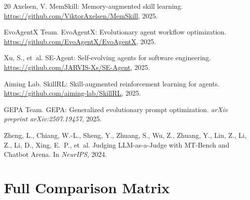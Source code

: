 \documentclass[11pt]{article}
\begin{document}
\begin{thebibliography}{20}
Axelsen, V.
\newblock MemSkill: Memory-augmented skill learning.
\newblock \url{https://github.com/ViktorAxelsen/MemSkill}, 2025.

EvoAgentX Team.
\newblock EvoAgentX: Evolutionary agent workflow optimization.
\newblock \url{https://github.com/EvoAgentX/EvoAgentX}, 2025.

Xu, S., et~al.
\newblock SE-Agent: Self-evolving agents for software engineering.
\newblock \url{https://github.com/JARVIS-Xs/SE-Agent}, 2025.

Aiming Lab.
\newblock SkillRL: Skill-augmented reinforcement learning for agents.
\newblock \url{https://github.com/aiming-lab/SkillRL}, 2025.

GEPA Team.
\newblock GEPA: Generalized evolutionary prompt optimization.
\newblock \emph{arXiv preprint arXiv:2507.19457}, 2025.

Zheng, L., Chiang, W.-L., Sheng, Y., Zhuang, S., Wu, Z., Zhuang, Y., Lin, Z., Li, Z., Li, D., Xing, E.~P., et~al.
\newblock Judging {LLM}-as-a-Judge with {MT}-Bench and Chatbot Arena.
\newblock In \emph{NeurIPS}, 2024.

\end{thebibliography}

\newpage
\appendix

\section{Full Comparison Matrix}
\label{app:matrix}
\end{document}
